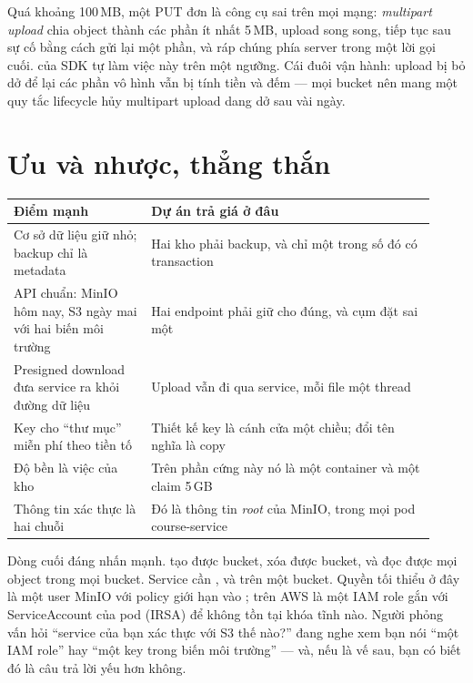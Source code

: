 Quá khoảng 100\,MB, một PUT đơn là công cụ sai trên mọi mạng:
\emph{multipart upload} chia object thành các phần ít nhất 5\,MB,
upload song song, tiếp tục sau sự cố bằng cách gửi lại một phần, và ráp
chúng phía server trong một lời gọi cuối.  của
SDK tự làm việc này trên một ngưỡng. Cái đuôi vận hành: upload bị bỏ dở
để lại các phần vô hình vẫn bị tính tiền và đếm --- mọi bucket nên mang
một quy tắc lifecycle hủy multipart upload dang dở sau vài ngày.

\section{Ưu và nhược, thẳng thắn}

\begin{center}
\begin{tabular}{@{}p{0.3\linewidth}p{0.62\linewidth}@{}}
\toprule
\textbf{Điểm mạnh} & \textbf{Dự án trả giá ở đâu} \\
\midrule
Cơ sở dữ liệu giữ nhỏ; backup chỉ là metadata &
  Hai kho phải backup, và chỉ một trong số đó có transaction \\
API chuẩn: MinIO hôm nay, S3 ngày mai với hai biến môi trường &
  Hai endpoint phải giữ cho đúng, và cụm đặt sai một \\
Presigned download đưa service ra khỏi đường dữ liệu &
  Upload vẫn đi qua service, mỗi file một thread \\
Key cho ``thư mục'' miễn phí theo tiền tố &
  Thiết kế key là cánh cửa một chiều; đổi tên nghĩa là copy \\
Độ bền là việc của kho &
  Trên phần cứng này nó là một container và một claim 5\,GB \\
Thông tin xác thực là hai chuỗi &
  Đó là thông tin \emph{root} của MinIO, trong mọi pod course-service \\
\bottomrule
\end{tabular}
\end{center}

Dòng cuối đáng nhấn mạnh.  tạo được bucket, xóa được
bucket, và đọc được mọi object trong mọi bucket. Service cần
,  và  trên một bucket.
Quyền tối thiểu ở đây là một user MinIO với policy giới hạn vào
; trên AWS là một IAM role gắn với
ServiceAccount của pod (IRSA) để không tồn tại khóa tĩnh nào. Người
phỏng vấn hỏi ``service của bạn xác thực với S3 thế nào?'' đang nghe
xem bạn nói ``một IAM role'' hay ``một key trong biến môi trường'' ---
và, nếu là vế sau, bạn có biết đó là câu trả lời yếu hơn không.

